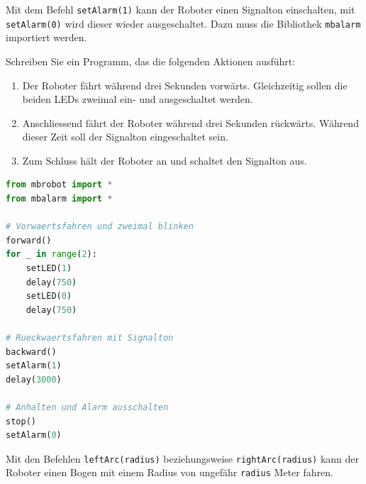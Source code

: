 \begin{myexercise}

    Mit dem Befehl \texttt{setAlarm(1)} kann der Roboter
    einen Signalton einschalten, mit \texttt{setAlarm(0)}
    wird dieser wieder ausgeschaltet. Dazu muss die
    Bibliothek \texttt{mbalarm} importiert werden.

    Schreiben Sie ein Programm, das die folgenden
    Aktionen ausführt:

    \begin{enumerate}
        \item Der Roboter fährt während drei Sekunden
              vorwärts. Gleichzeitig sollen die beiden
              LEDs zweimal ein- und ausgeschaltet werden.

        \item Anschliessend fährt der Roboter während
              drei Sekunden rückwärts. Während dieser
              Zeit soll der Signalton eingeschaltet sein.

        \item Zum Schluss hält der Roboter an und
              schaltet den Signalton aus.
    \end{enumerate}

    \begin{myanswer}
        \begin{lstlisting}[language=Python]
from mbrobot import *
from mbalarm import *

# Vorwaertsfahren und zweimal blinken
forward()
for _ in range(2):
    setLED(1)
    delay(750)
    setLED(0)
    delay(750)

# Rueckwaertsfahren mit Signalton
backward()
setAlarm(1)
delay(3000)

# Anhalten und Alarm ausschalten
stop()
setAlarm(0)
        \end{lstlisting}
    \end{myanswer}
\end{myexercise}


Mit den Befehlen \texttt{leftArc(radius)} beziehungsweise \texttt{rightArc(radius)} kann der Roboter einen Bogen mit einem Radius von ungefähr \texttt{radius} Meter fahren.

